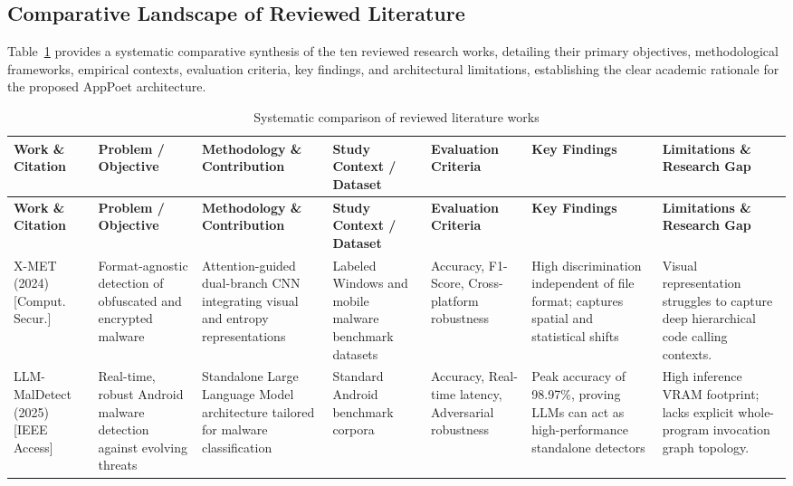 \documentclass[12pt,a4paper,oneside]{report}
\begin{document}
\begin{landscape}
\section{Comparative Landscape of Reviewed Literature}
Table~\ref{tab:literature} provides a systematic comparative synthesis of the ten reviewed research works, detailing their primary objectives, methodological frameworks, empirical contexts, evaluation criteria, key findings, and architectural limitations, establishing the clear academic rationale for the proposed AppPoet architecture.

\begingroup\footnotesize\setlength{\tabcolsep}{3.5pt}\renewcommand{\arraystretch}{1.12}
\begin{longtable}{|p{2.1cm}|p{2.5cm}|p{3.3cm}|p{2.4cm}|p{2.6cm}|p{2.8cm}|p{3.3cm}|}
\caption{Systematic comparison of reviewed literature works}\label{tab:literature}\\\hline
\textbf{Work \& Citation} & \textbf{Problem / Objective} & \textbf{Methodology \& Contribution} & \textbf{Study Context / Dataset} & \textbf{Evaluation Criteria} & \textbf{Key Findings} & \textbf{Limitations \& Research Gap}\\\hline\endfirsthead
\textbf{Work \& Citation} & \textbf{Problem / Objective} & \textbf{Methodology \& Contribution} & \textbf{Study Context / Dataset} & \textbf{Evaluation Criteria} & \textbf{Key Findings} & \textbf{Limitations \& Research Gap}\\\hline\endhead

X-MET (2024) \cite{ref16} [Comput. Secur.] & Format-agnostic detection of obfuscated and encrypted malware & Attention-guided dual-branch CNN integrating visual and entropy representations & Labeled Windows and mobile malware benchmark datasets & Accuracy, F1-Score, Cross-platform robustness & High discrimination independent of file format; captures spatial and statistical shifts & Visual representation struggles to capture deep hierarchical code calling contexts.\\\hline

LLM-MalDetect (2025) \cite{ref17} [IEEE Access] & Real-time, robust Android malware detection against evolving threats & Standalone Large Language Model architecture tailored for malware classification & Standard Android benchmark corpora & Accuracy, Real-time latency, Adversarial robustness & Peak accuracy of 98.97\%, proving LLMs can act as high-performance standalone detectors & High inference VRAM footprint; lacks explicit whole-program invocation graph topology.\\\hline


\end{longtable}
\end{landscape}
\end{document}
